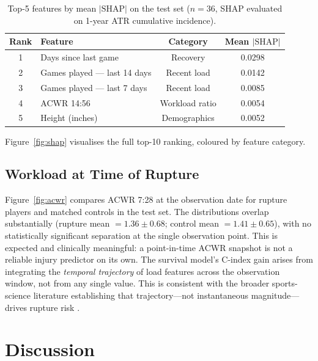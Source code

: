 \documentclass{article}
\begin{document}
\begin{table}[h]
\centering
\caption{Top-5 features by mean $|\text{SHAP}|$ on the test set
($n=36$, SHAP evaluated on 1-year ATR cumulative incidence).}
\label{tab:shap}
\begin{tabular}{clcc}
\toprule
Rank & Feature & Category & Mean $|\text{SHAP}|$ \\
\midrule
1 & Days since last game        & Recovery         & 0.0298 \\
2 & Games played — last 14 days  & Recent load      & 0.0142 \\
3 & Games played — last 7 days   & Recent load      & 0.0085 \\
4 & ACWR 14:56                  & Workload ratio   & 0.0054 \\
5 & Height (inches)             & Demographics     & 0.0052 \\
\bottomrule
\end{tabular}
\end{table}

\noindent Figure~\ref{fig:shap} visualises the full top-10 ranking, coloured by
feature category.

\subsection{Workload at Time of Rupture}

Figure~\ref{fig:acwr} compares ACWR 7:28 at the observation date for rupture
players and matched controls in the test set.  The distributions overlap
substantially (rupture mean $=1.36 \pm 0.68$; control mean $=1.41 \pm 0.65$),
with no statistically significant separation at the single observation point.
This is expected and clinically meaningful: a point-in-time ACWR snapshot is
not a reliable injury predictor on its own.  The survival model's C-index gain
arises from integrating the \emph{temporal trajectory} of load features across
the observation window, not from any single value.  This is consistent with the
broader sports-science literature establishing that trajectory---not
instantaneous magnitude---drives rupture risk \citep{gabbett2016,torresronda2022}.

\section{Discussion}
\label{sec:discussion}
\end{document}

